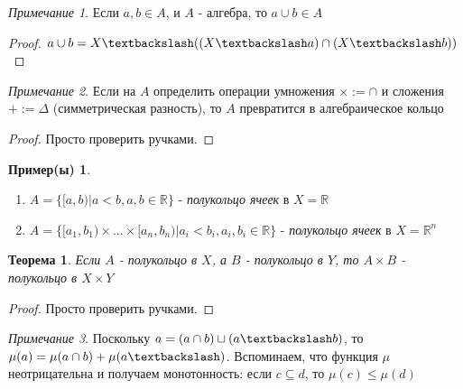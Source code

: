 \documentclass[a4paper]{article}
\theoremstyle{indented}
\newtheorem{theorem}{Теорема}
\theoremstyle{definition}
\newtheorem{exl}{Пример(ы)}
\theoremstyle{remark}
\newtheorem{remark}{Примечание}
\begin{document}
\begin{remark}
Если $a, b \in A$, и $A$ - алгебра, то $a \cup b \in A$
\end{remark}
\begin{proof}
$a \cup b = X \textbackslash ((X \textbackslash a)\cap (X \textbackslash b))$
\end{proof}
\begin{remark}
Если на $A$ определить операции умножения $\times := \cap$ и сложения $+ := \Delta$ (симметрическая разность), то $A$ превратится в алгебраическое кольцо
\end{remark}
\begin{proof}
Просто проверить ручками.
\end{proof}
\begin{exl}
\begin{enumerate}
    \item $A=\{[a, b) | a<b, a, b \in \mathbb{R}\}$ - \textit{полукольцо ячеек} в $X=\mathbb{R}$
    \item $A=\{[a_1, b_1) \times ... \times [a_n, b_n) | a_i<b_i, a_i, b_i \in \mathbb{R}\}$ - \textit{полукольцо ячеек} в $X=\mathbb{R}^n$
\end{enumerate}
\end{exl}
\begin{theorem}
Если $A$ - полукольцо в $X$, а $B$ - полукольцо в $Y$, то $A \times B$ - полукольцо в $X \times Y$
\end{theorem}
\begin{proof}
Просто проверить ручками.
\end{proof}

\begin{remark}
    Поскольку $a = (a \cap b) \sqcup (a \textbackslash b)$, то $\mu(a)=\mu(a \cap b) + \mu(a \textbackslash)$. Вспоминаем, что функция $\mu$ неотрицательна и получаем монотонность: если $c \subseteq d$, то $\mu(c) \leq \mu(d)$
    \end{remark}
\end{document}
